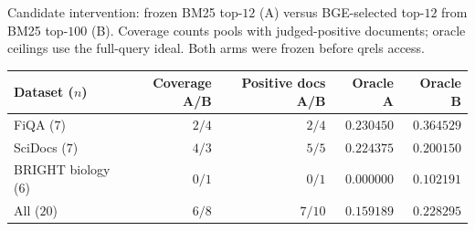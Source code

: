 \begin{supplementtable}
\caption{Candidate intervention: frozen BM25 top-$12$ (A) versus BGE-selected top-$12$ from BM25 top-$100$ (B). Coverage counts pools with judged-positive documents; oracle ceilings use the full-query ideal. Both arms were frozen before qrels access.}
\label{tab:candidate-intervention}
\sncstable
\begin{tabularx}{\linewidth}{@{}Yrrrr@{}}
\toprule
Dataset ($n$) & Coverage A/B & Positive docs A/B & Oracle A & Oracle B \\
\midrule
FiQA ($7$) & $2/4$ & $2/4$ & $0.230450$ & $0.364529$ \\
SciDocs ($7$) & $4/3$ & $5/5$ & $0.224375$ & $0.200150$ \\
BRIGHT biology ($6$) & $0/1$ & $0/1$ & $0.000000$ & $0.102191$ \\
All ($20$) & $6/8$ & $7/10$ & $0.159189$ & $0.228295$ \\
\bottomrule
\end{tabularx}
\end{supplementtable}